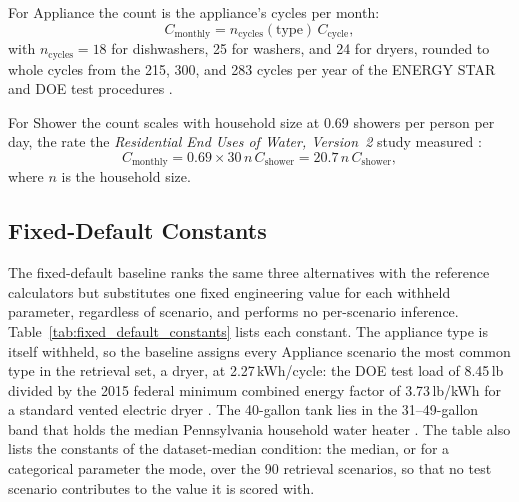 \documentclass[11pt]{article}
\begin{document}
For Appliance the count is the appliance's cycles per month:
\begin{equation}
C_{\mathrm{monthly}} = n_{\mathrm{cycles}}(\text{type})\,C_{\mathrm{cycle}},
\end{equation}
with $n_{\mathrm{cycles}} = 18$ for dishwashers, 25 for washers, and 24 for dryers, rounded to whole cycles from the 215, 300, and 283 cycles per year of the ENERGY STAR and DOE test procedures \citep{energystar_dishwasher_criteria2023,energystar_clotheswasher,doe_dryer_tp_2011}.

For Shower the count scales with household size at 0.69 showers per person per day, the rate the \textit{Residential End Uses of Water, Version~2} study measured \citep{reu2016,gauley2017showering}:
\begin{equation}
C_{\mathrm{monthly}} = 0.69 \times 30\,n\,C_{\mathrm{shower}} = 20.7\,n\,C_{\mathrm{shower}},
\end{equation}
where $n$ is the household size.

\subsection{Fixed-Default Constants}
\label{app:fixed_default}

The fixed-default baseline ranks the same three alternatives with the reference
calculators but substitutes one fixed engineering value for each withheld
parameter, regardless of scenario, and performs no per-scenario inference.
Table~\ref{tab:fixed_default_constants} lists each constant. The appliance
type is itself withheld, so the baseline assigns every Appliance scenario the
most common type in the retrieval set, a dryer, at 2.27\,kWh/cycle: the DOE
test load of 8.45\,lb divided by the 2015 federal minimum combined energy
factor of 3.73\,lb/kWh for a standard vented electric dryer
\citep{cfr430_32h}. The 40-gallon tank lies in the 31--49-gallon band that
holds the median Pennsylvania household water heater \citep{eia_recs2020micro}.
The table also lists the constants of the dataset-median condition: the
median, or for a categorical parameter the mode, over the 90 retrieval
scenarios, so that no test scenario contributes to the value it is scored
with.
\end{document}
